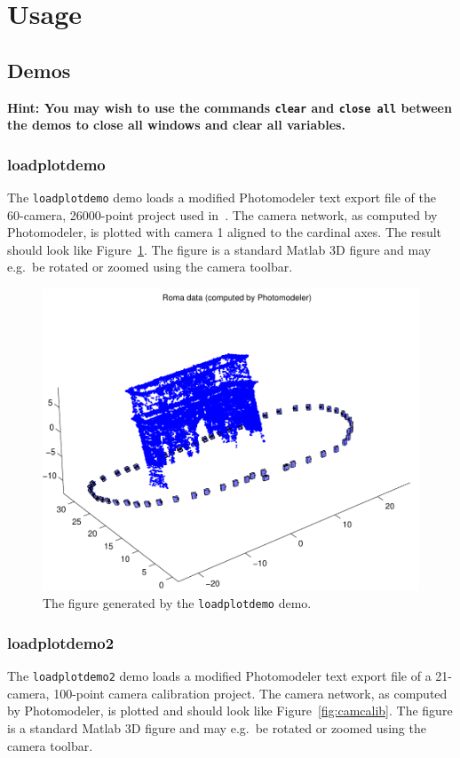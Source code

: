 \documentclass{article}
\begin{document}
\section{Usage}

\subsection{Demos}
\label{sec:demos}

{\bf Hint: You may wish to use the commands {\tt clear} and {\tt close
    all} between the demos to close all windows and clear all variables.}

\subsubsection{loadplotdemo}
\label{sec:loadplotdemo}
\label{sec:loadroma}

The \verb+loadplotdemo+ demo loads a modified Photomodeler text export
file of the 60-camera, 26000-point project used
in~\citet{Borlin2013:Bundle}. The camera network, as computed by
Photomodeler, is plotted with camera 1 aligned to the cardinal axes.
The result should look like Figure~\ref{fig:roma}. The figure is a standard Matlab 3D figure and
may e.g.\ be rotated or zoomed using the camera toolbar.

\begin{figure}
  \centering
  \includegraphics[width=0.5\hsize]{ill/roma}
  \caption{The figure generated by the \texttt{loadplotdemo} demo.}
  \label{fig:roma}
\end{figure}

\subsubsection{loadplotdemo2}
\label{sec:camcaldata}

The \verb+loadplotdemo2+ demo loads a modified Photomodeler text
export file of a 21-camera, 100-point camera calibration project. The
camera network, as computed by Photomodeler, is plotted and should
look like Figure~\ref{fig:camcalib}. The figure is a standard Matlab
3D figure and may e.g.\ be rotated or zoomed using the camera toolbar.
\end{document}
